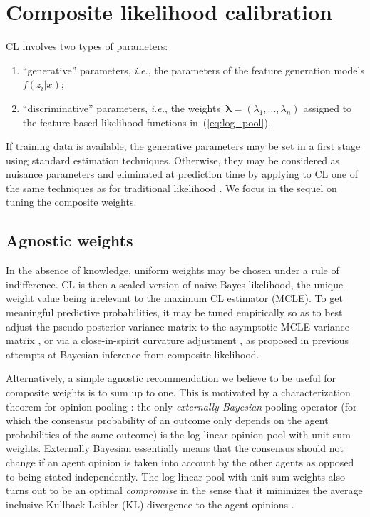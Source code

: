 \documentclass[english]{scrartcl}
\newcommand{\blambda}{{\boldsymbol{\lambda}}}
\begin{document}
\section{Composite likelihood calibration}
\label{sec:calibration}

CL involves two types of parameters:
\begin{enumerate}
    \item ``generative'' parameters, {\em i.e.}, the parameters of the feature generation models $f(z_i|x)$; 
    \item ``discriminative'' parameters, {\em i.e.},  the weights~$\blambda=(\lambda_1,\ldots,\lambda_n)$ assigned to the feature-based likelihood functions in~(\ref{eq:log_pool}).
\end{enumerate}

If training data is available, the generative parameters may be set in a first stage using standard estimation techniques. Otherwise, they may be considered as nuisance parameters and eliminated at prediction time by applying to CL one of the same techniques as for traditional likelihood \cite{Berger-99}. We focus in the sequel on tuning the composite weights.


\subsection{Agnostic weights}

In the absence of knowledge, uniform weights may be chosen under a rule of indifference. CL is then a scaled version of na\"ive Bayes likelihood, the unique weight value being irrelevant to the maximum CL estimator (MCLE). To get meaningful predictive probabilities, it may be tuned empirically so as to best adjust the pseudo posterior variance matrix to the asymptotic MCLE variance matrix \cite{Pauli-11}, or via a close-in-spirit curvature adjustment \cite{Ribatet-12}, as proposed in previous attempts at Bayesian inference from composite likelihood. 

Alternatively, a simple agnostic recommendation we believe to be useful for composite weights is to sum up to one. This is motivated by a characterization theorem for opinion pooling \cite{Genest-86,Genest-86b}: the only {\em externally Bayesian} pooling operator (for which the consensus probability of an outcome only depends on the agent probabilities of the same outcome) is the log-linear opinion pool with unit sum weights. Externally Bayesian essentially means that the consensus should not change if an agent opinion is taken into account by the other agents as opposed to being stated independently. The log-linear pool with unit sum weights also turns out to be an optimal {\em compromise} in the sense that it minimizes the average inclusive Kullback-Leibler (KL) divergence to the agent opinions \cite{Garg-04}. 
\end{document}
